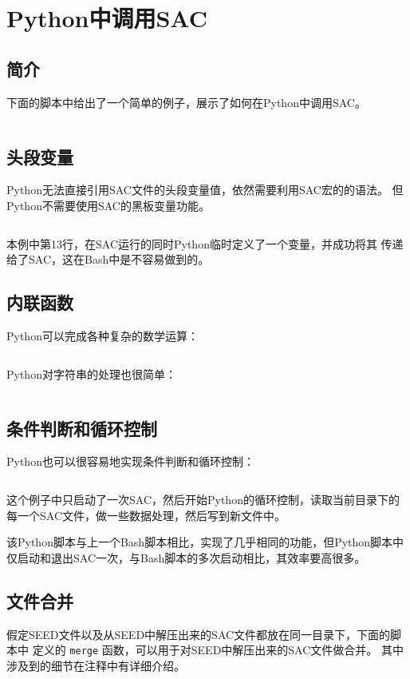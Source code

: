 \section{Python中调用SAC}
\label{sec:sac-python}

\subsection{简介}
下面的脚本中给出了一个简单的例子，展示了如何在Python中调用SAC。
\inputminted{python}{./call-in-script/simple-script.py}

\subsection{头段变量}
Python无法直接引用SAC文件的头段变量值，依然需要利用SAC宏的的语法。
但Python不需要使用SAC的黑板变量功能。
\inputminted{python}{./call-in-script/variables.py}
本例中第13行，在SAC运行的同时Python临时定义了一个变量，并成功将其
传递给了SAC，这在Bash中是不容易做到的。

\subsection{内联函数}
Python可以完成各种复杂的数学运算：
\inputminted{python}{./call-in-script/arithmetic-functions.py}

Python对字符串的处理也很简单：
\inputminted{python}{./call-in-script/string-functions.py}

\subsection{条件判断和循环控制}
Python也可以很容易地实现条件判断和循环控制：
\inputminted{python}{./call-in-script/do-loops.py}
这个例子中只启动了一次SAC，然后开始Python的循环控制，读取当前目录下的
每一个SAC文件，做一些数据处理，然后写到新文件中。

该Python脚本与上一个Bash脚本相比，实现了几乎相同的功能，但Python脚本中
仅启动和退出SAC一次，与Bash脚本的多次启动相比，其效率要高很多。

\subsection{文件合并}
\label{subsec:merge-in-python}
假定SEED文件以及从SEED中解压出来的SAC文件都放在同一目录下，下面的脚本中
定义的 \texttt{merge} 函数，可以用于对SEED中解压出来的SAC文件做合并。
其中涉及到的细节在注释中有详细介绍。
\inputminted{python}{./call-in-script/merge.py}


